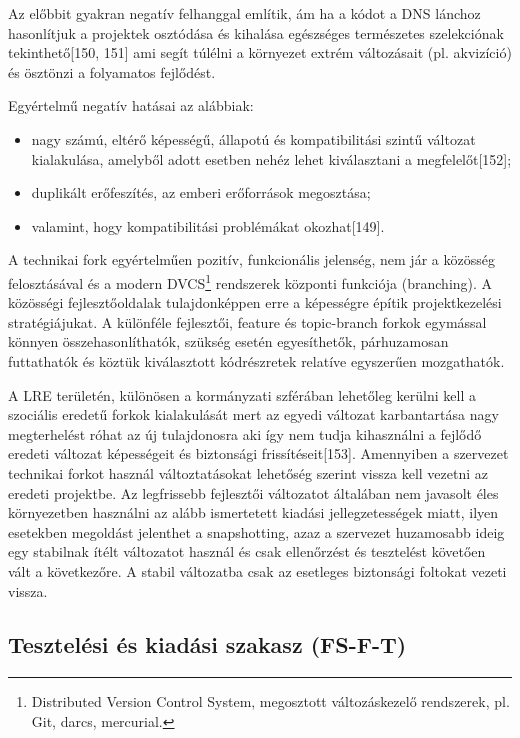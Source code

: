 \documentclass[12pt,magyar,a4paper,oneside]{scrreprt}
\providecommand{\tightlist}{%
  \setlength{\itemsep}{0pt}\setlength{\parskip}{0pt}}
\begin{document}
Az előbbit gyakran negatív felhanggal említik, ám ha a kódot a DNS
lánchoz hasonlítjuk a projektek osztódása és kihalása egészséges
természetes szelekciónak tekinthető{[}150, 151{]} ami segít túlélni a
környezet extrém változásait (pl. akvizíció) és ösztönzi a folyamatos
fejlődést.

Egyértelmű negatív hatásai az alábbiak:

\begin{itemize}
\tightlist
\item
  nagy számú, eltérő képességű, állapotú és kompatibilitási szintű
  változat kialakulása, amelyből adott esetben nehéz lehet kiválasztani
  a megfelelőt{[}152{]};
\item
  duplikált erőfeszítés, az emberi erőforrások megosztása;
\item
  valamint, hogy kompatibilitási problémákat okozhat{[}149{]}.
\end{itemize}

A technikai fork egyértelműen pozitív, funkcionális jelenség, nem jár a
közösség felosztásával és a modern DVCS\footnote{Distributed Version
  Control System, megosztott változáskezelő rendszerek, pl. Git, darcs,
  mercurial.} rendszerek központi funkciója (branching). A közösségi
fejlesztőoldalak tulajdonképpen erre a képességre építik projektkezelési
stratégiájukat. A különféle fejlesztői, feature és topic-branch forkok
egymással könnyen összehasonlíthatók, szükség esetén egyesíthetők,
párhuzamosan futtathatók és köztük kiválasztott kódrészretek relatíve
egyszerűen mozgathatók.

A LRE területén, különösen a kormányzati szférában lehetőleg kerülni
kell a szociális eredetű forkok kialakulását mert az egyedi változat
karbantartása nagy megterhelést róhat az új tulajdonosra aki így nem
tudja kihasználni a fejlődő eredeti változat képességeit és biztonsági
frissítéseit{[}153{]}. Amennyiben a szervezet technikai forkot használ
változtatásokat lehetőség szerint vissza kell vezetni az eredeti
projektbe. Az legfrissebb fejlesztői változatot általában nem javasolt
éles környezetben használni az alább ismertetett kiadási
jellegzetességek miatt, ilyen esetekben megoldást jelenthet a
snapshotting, azaz a szervezet huzamosabb ideig egy stabilnak ítélt
változatot használ és csak ellenőrzést és tesztelést követően vált a
következőre. A stabil változatba csak az esetleges biztonsági foltokat
vezeti vissza.

\hypertarget{sec:FS-F-T}{%
\subsection{Tesztelési és kiadási szakasz (FS-F-T)}\label{sec:FS-F-T}}
\end{document}
